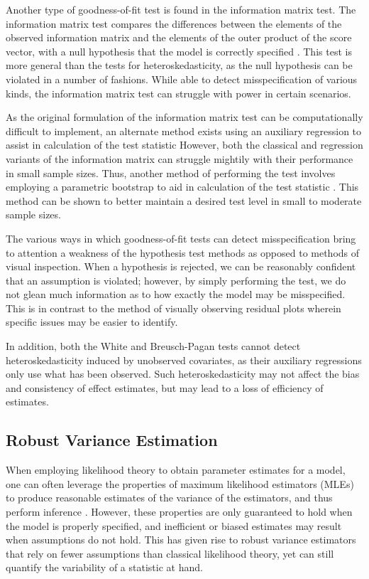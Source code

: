 \documentclass[submit]{smj}
\begin{document}
		Another type of goodness-of-fit test is found in the information matrix test. The information matrix test compares the differences between the elements of the observed information matrix and the elements
		of the outer product of the score vector, with a null hypothesis that the model is correctly specified \citep{White1982}. This test is more general than the tests for heteroskedasticity, as the null
		hypothesis can be violated in a number of fashions. While able to
		detect misspecification of various kinds, the information matrix test can struggle with power in certain scenarios.
  
        As the original formulation of the information matrix test can be computationally difficult to implement, an alternate method exists using an
		auxiliary regression to assist in calculation of the test statistic \citep{Chesher} However, both the classical and regression variants of the information matrix can struggle mightily with their performance in small sample sizes. Thus, another method of performing the test involves employing a parametric bootstrap to aid in calculation of the test statistic \citep{Dhaene}. This method can be shown to better maintain a desired test level in small to moderate sample sizes. 

		The various ways in which goodness-of-fit tests can detect misspecification bring to attention a weakness of the hypothesis test methods as opposed to methods of visual inspection.
		When a hypothesis is rejected, we can be reasonably confident that an assumption is violated; however, by simply performing the test, we do not glean much information as to how exactly the
		model may be misspecified. This is in contrast to the method of visually observing residual plots wherein specific issues may be easier to identify.

		In addition, both the White and Breusch-Pagan tests cannot detect heteroskedasticity induced by unobserved covariates, as their auxiliary regressions only use what has been observed. Such heteroskedasticity
		may not affect the bias and consistency of effect estimates, but may lead to a loss of efficiency of estimates. 

	\subsection*{Robust Variance Estimation}

		When employing likelihood theory to obtain parameter estimates for a model, one can often leverage the properties of maximum likelihood estimators (MLEs) to produce reasonable estimates of the variance of the
		estimators, and thus perform inference \citep{Millar}. However, these properties are only guaranteed to hold when the model is properly specified, and inefficient or biased estimates may result when assumptions
		do not hold. This has given rise to robust variance estimators that rely on fewer assumptions than classical likelihood theory, yet can still quantify the variability of a statistic
		at hand.
\end{document}
